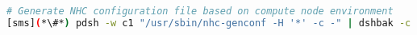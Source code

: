 \begin{lstlisting}[language=bash,keywords={},upquote=true]

# Generate NHC configuration file based on compute node environment
[sms](*\#*) pdsh -w c1 "/usr/sbin/nhc-genconf -H '*' -c -" | dshbak -c

\end{lstlisting}

